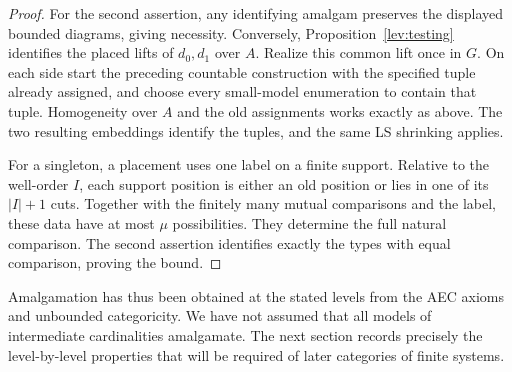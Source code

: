 \begin{proof}
For the second assertion, any identifying amalgam preserves
the displayed bounded diagrams, giving necessity. Conversely,
Proposition~\ref{lev:testing} identifies the placed lifts
of \(d_0,d_1\) over \(A\). Realize this common lift once
in \(G\). On each side start the preceding countable
construction with the specified tuple already assigned,
and choose every small-model enumeration to contain that
tuple. Homogeneity over \(A\) and the old assignments works
exactly as above. The two resulting embeddings identify the
tuples, and the same LS shrinking applies.

For a singleton, a placement uses one label on a finite
support. Relative to the well-order \(I\), each support
position is either an old position or lies in one of its
\(|I|+1\) cuts. Together with the finitely many mutual
comparisons and the label, these data have at most
\(\mu\) possibilities. They determine the full natural
comparison. The second assertion identifies exactly the
types with equal comparison, proving the bound.
\end{proof}

Amalgamation has thus been obtained at the stated levels from the
AEC axioms and unbounded categoricity. We have not assumed that
all models of intermediate cardinalities amalgamate. The next
section records precisely the level-by-level properties that
will be required of later categories of finite systems.
